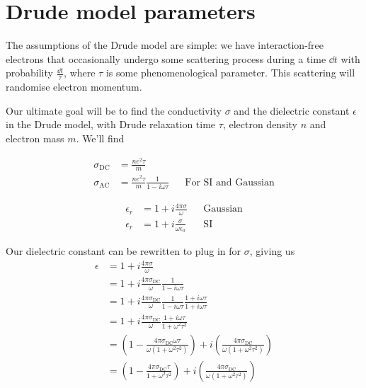 \documentclass[../../main.tex]{subfiles}
\newcommand{\sigmaDC}{\sigma_{\textrm{DC}}}
\newcommand{\sigmaAC}{\sigma_{\textrm{AC}}}
\begin{document}
\section{Drude model parameters}

The assumptions of the Drude model are simple: we have interaction-free electrons that occasionally undergo some scattering process during a time $\dd{t}$ with probability $\frac{\dd{t}}{\tau}$, where $\tau$ is some phenomenological parameter. This scattering will randomise electron momentum.

Our ultimate goal will be to find the conductivity $\sigma$ and the dielectric constant $\epsilon$ in the Drude model, with Drude relaxation time $\tau$, electron density $n$ and electron mass $m$. We'll find

\begin{align}
	\sigmaDC &= \frac{n e^2 \tau}{m} \\
	\sigmaAC &= \frac{n e^2 \tau}{m} \frac{1}{1 - i \omega \tau} && \text{For SI and Gaussian} \label{eq:DrudeTheory:SigmaAC}
\end{align}

\begin{subequations}
	\begin{align}
		\epsilon_r &= 1 + i \frac{4 \pi \sigma}{\omega} && \text{Gaussian} \\
		\epsilon_r &= 1 + i \frac{\sigma}{\omega \epsilon_0} && \text{SI} 
	\end{align}
\end{subequations}

Our dielectric constant can be rewritten to plug in for $\sigma$, giving us
\begin{align}
	\epsilon &= 1 + i \frac{4 \pi \sigma}{\omega} \\
	&= 1 + i \frac{4 \pi \sigmaDC}{\omega} \frac{1}{1 - i \omega \tau} \\
 &= 1 + i \frac{4 \pi \sigmaDC}{\omega} \frac{1}{1 - i \omega \tau} \frac{1 + i \omega\tau}{1 + i \omega \tau} \\
 &= 1 + i \frac{4 \pi \sigmaDC}{\omega} \frac{1 + i \omega \tau}{1 + \omega^2 \tau^2} \\
 &= \left(1 - \frac{4 \pi \sigmaDC \omega \tau}{\omega\left(1 + \omega^2 \tau^2 \right)} \right) + i \left( \frac{4 \pi \sigmaDC}{\omega \left( 1 + \omega^2 \tau^2 \right)} \right) \\
 &= \left(1 - \frac{4 \pi \sigmaDC  \tau}{1 + \omega^2 \tau^2 } \right) + i \left( \frac{4 \pi \sigmaDC}{\omega \left( 1 + \omega^2 \tau^2 \right)} \right) 
\end{align}
\end{document}
